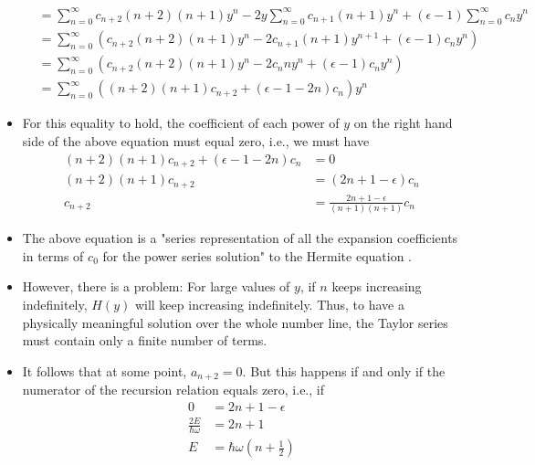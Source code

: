 \documentclass[../notes.tex]{subfiles}
\begin{document}
\begin{itemize}
\begin{align*}
        &= \sum_{n=0}^\infty c_{n+2}(n+2)(n+1)y^n-2y\sum_{n=0}^\infty c_{n+1}(n+1)y^n+(\epsilon-1)\sum_{n=0}^\infty c_ny^n\\
        &= \sum_{n=0}^\infty(c_{n+2}(n+2)(n+1)y^n-2c_{n+1}(n+1)y^{n+1}+(\epsilon-1)c_ny^n)\\
        &= \sum_{n=0}^\infty(c_{n+2}(n+2)(n+1)y^n-2c_nny^n+(\epsilon-1)c_ny^n)\\
        &= \sum_{n=0}^\infty((n+2)(n+1)c_{n+2}+(\epsilon-1-2n)c_n)y^n
    \end{align*}
    \endgroup
    \item For this equality to hold, the coefficient of each power of $y$ on the right hand side of the above equation must equal zero, i.e., we must have
    \begin{align*}
        (n+2)(n+1)c_{n+2}+(\epsilon-1-2n)c_n &= 0\\
        (n+2)(n+1)c_{n+2} &= (2n+1-\epsilon)c_n\\
        c_{n+2} &= \frac{2n+1-\epsilon}{(n+1)(n+1)}c_n
    \end{align*}
    \item The above equation is a "series representation of all the expansion coefficients in terms of $c_0$ for the power series solution" to the Hermite equation \parencite{bib:HarmonicOscillator}.
    \item However, there is a problem: For large values of $y$, if $n$ keeps increasing indefinitely, $H(y)$ will keep increasing indefinitely. Thus, to have a physically meaningful solution over the whole number line, the Taylor series must contain only a finite number of terms.
    \item It follows that at some point, $a_{n+2}=0$. But this happens if and only if the numerator of the recursion relation equals zero, i.e., if
    \begin{align*}
        0 &= 2n+1-\epsilon\\
        \frac{2E}{\hbar\omega} &= 2n+1\\
        E &= \hbar\omega\left( n+\frac{1}{2} \right)
    \end{align*}
\end{itemize}
\end{document}

